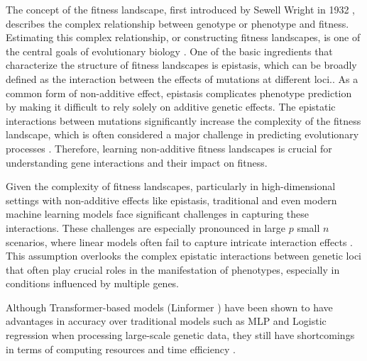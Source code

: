\documentclass{article}
\begin{document}
The concept of the fitness landscape, first introduced by Sewell Wright in 1932 \parencite{wright1932roles}, describes the complex relationship between genotype or phenotype and fitness. Estimating this complex relationship, or constructing fitness landscapes, is one of the central goals of evolutionary biology \parencite{patton2022hybridization}. One of the basic ingredients that characterize the structure of fitness landscapes is epistasis, which can be broadly defined as the interaction between the effects of mutations at different loci.\parencite {ferretti2016measuring}. As a common form of non-additive effect, epistasis complicates phenotype prediction by making it difficult to rely solely on additive genetic effects. The epistatic interactions between mutations significantly increase the complexity of the fitness landscape, which is often considered a major challenge in predicting evolutionary processes \parencite{diaz2023global}. Therefore, learning non-additive fitness landscapes is crucial for understanding gene interactions and their impact on fitness.


Given the complexity of fitness landscapes, particularly in high-dimensional settings with non-additive effects like epistasis, traditional and even modern machine learning models face significant challenges in capturing these interactions. These challenges are especially pronounced in large $p$ small $n$ scenarios, where linear models often fail to capture intricate interaction effects \parencite{eichler2010missing}. This assumption overlooks the complex epistatic interactions between genetic loci that often play crucial roles in the manifestation of phenotypes, especially in conditions influenced by multiple genes.


Although Transformer-based models (Linformer \parencite{wang2020linformer}) have been shown to have advantages in accuracy over traditional models such as MLP and Logistic regression when processing large-scale genetic data, they still have shortcomings in terms of computing resources and time efficiency \parencite{kieransimulatepaper}. 


\end{document}
